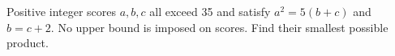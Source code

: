 Positive integer scores $a,b,c$ all exceed 35 and satisfy $a^2=5(b+c)$ and $b=c+2$. No upper bound is imposed on scores. Find their smallest possible product.

